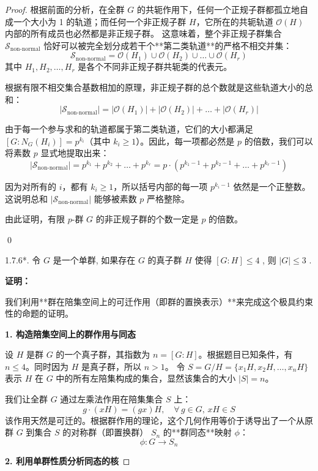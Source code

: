 \documentclass[]{article}
\begin{document}
\begin{proof}
根据前面的分析，在全群 $G$ 的共轭作用下，任何一个正规子群都孤立地自成一个大小为 1 的轨道；而任何一个非正规子群 $H$，它所在的共轭轨道 $\mathcal{O}(H)$ 内部的所有成员也必然都是非正规子群。
这意味着，整个非正规子群集合 $\mathcal{S}_{\text{non-normal}}$ 恰好可以被完全划分成若干个**第二类轨道**的严格不相交并集：
\[ \mathcal{S}_{\text{non-normal}} = \mathcal{O}(H_1) \cup \mathcal{O}(H_2) \cup \dots \cup \mathcal{O}(H_r) \]
其中 $H_1, H_2, \dots, H_r$ 是各个不同非正规子群共轭类的代表元。

根据有限不相交集合基数相加的原理，非正规子群的总个数就是这些轨道大小的总和：
\[ |\mathcal{S}_{\text{non-normal}}| = |\mathcal{O}(H_1)| + |\mathcal{O}(H_2)| + \dots + |\mathcal{O}(H_r)| \]

由于每一个参与求和的轨道都属于第二类轨道，它们的大小都满足 $[G : N_G(H_i)] = p^{k_i}$（其中 $k_i \ge 1$）。因此，每一项都必然是 $p$ 的倍数，我们可以将素数 $p$ 显式地提取出来：
\[ |\mathcal{S}_{\text{non-normal}}| = p^{k_1} + p^{k_2} + \dots + p^{k_r} = p \cdot \left( p^{k_1 - 1} + p^{k_2 - 1} + \dots + p^{k_r - 1} \right) \]

因为对所有的 $i$，都有 $k_i \ge 1$，所以括号内部的每一项 $p^{k_i - 1}$ 依然是一个正整数。这说明总和 $|\mathcal{S}_{\text{non-normal}}|$ 能够被素数 $p$ 严格整除。

由此证明，有限 $p$-群 $G$ 的非正规子群的个数一定是 $p$ 的倍数。

\qed

1.7.6*. 令 $G$ 是一个单群, 如果存在 $G$ 的真子群 $H$ 使得 $[G:H] \leqslant 4$ , 则 $|G| \leqslant 3$ . 

\bigskip
\noindent \textbf{证明：} 

我们利用**群在陪集空间上的可迁作用（即群的置换表示）**来完成这个极具约束性的命题的证明。

\bigskip
\noindent \textbf{1. 构造陪集空间上的群作用与同态}

设 $H$ 是群 $G$ 的一个真子群，其指数为 $n = [G:H]$。根据题目已知条件，有 $n \leqslant 4$。同时因为 $H$ 是真子群，所以 $n > 1$。
令 $S = G/H = \{ x_1H, x_2H, \dots, x_nH \}$ 表示 $H$ 在 $G$ 中的所有左陪集构成的集合，显然该集合的大小 $|S| = n$。

我们让全群 $G$ 通过左乘法作用在陪集集合 $S$ 上：
\[ g \cdot (xH) = (gx)H, \quad \forall \, g \in G, \, xH \in S \]
该作用天然是可迁的。根据群作用的理论，这个几何作用等价于诱导出了一个从原群 $G$ 到集合 $S$ 的对称群（即置换群） $S_n$ 的**群同态**映射 $\phi$：
\[ \phi: G \longrightarrow S_n \]

\bigskip
\noindent \textbf{2. 利用单群性质分析同态的核}


\end{proof}
\end{document}
